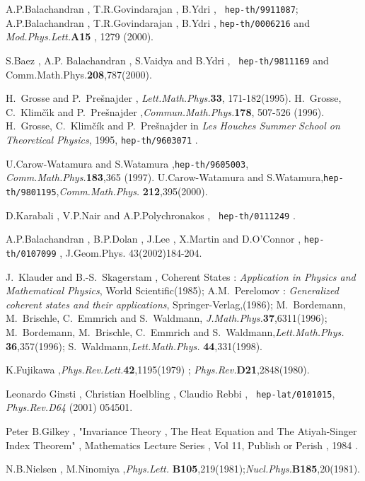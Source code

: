 \documentclass[a4paper,10pt]{article}
\begin{document}
\begin{thebibliography}{99}
A.P.Balachandran , T.R.Govindarajan , B.Ydri , {\tt
hep-th/9911087}; A.P.Balachandran , T.R.Govindarajan , B.Ydri ,
{\tt hep-th/0006216} and {\em Mod.Phys.Lett.}{\bf A15} , 1279
(2000).

S.Baez , A.P. Balachandran , S.Vaidya and B.Ydri , {\tt
hep-th/9811169} and Comm.Math.Phys.{\bf 208},787(2000).


H.~Grosse and P.~Pre\v{s}najder , {\em Lett.Math.Phys.}{\bf 33},
171-182(1995). H.~Grosse, C.~Klim\v{c}\'{\i}k and
P.~Pre\v{s}najder ,{\em Commun.Math.Phys.}{\bf 178}, 507-526
(1996). H.~Grosse, C.~Klim\v{c}\'{i}k and P.~Pre\v{s}najder in
{\em Les Houches Summer School on Theoretical Physics}, 1995,
{\tt hep-th/9603071} .


U.Carow-Watamura and S.Watamura ,{\tt hep-th/9605003},{\em
Comm.Math.Phys.}{\bf 183},365 (1997). U.Carow-Watamura and
S.Watamura,{\tt hep-th/9801195},{\em Comm.Math.Phys.} {\bf
212},395(2000).

D.Karabali , V.P.Nair and A.P.Polychronakos , {\tt
hep-th/0111249} .

A.P.Balachandran , B.P.Dolan , J.Lee , X.Martin and D.O'Connor ,
{\tt hep-th/0107099} , J.Geom.Phys. 43(2002)184-204.

J.~Klauder and B.-S.~Skagerstam , Coherent States : {\em
Application in Physics and Mathematical Physics}, World
Scientific(1985); A.M.~Perelomov : {\em Generalized coherent
states and their applications}, Springer-Verlag,(1986);
M.~Bordemann, M.~Brischle, C.~Emmrich and S.~Waldmann,{\em
J.Math.Phys.}{\bf 37},6311(1996); M.~Bordemann, M.~Brischle,
C.~Emmrich and S.~Waldmann,{\em Lett.Math.Phys.}{\bf
36},357(1996); S.~Waldmann,{\em Lett.Math.Phys.}{\bf
44},331(1998).

K.Fujikawa ,{\em Phys.Rev.Lett.}{\bf 42},1195(1979) ; {\em
Phys.Rev.}{\bf D21},2848(1980).

Leonardo Ginsti , Christian Hoelbling , Claudio Rebbi , {\tt
hep-lat/0101015}, {\em Phys.Rev.D64} (2001) 054501.


Peter B.Gilkey , "Invariance Theory , The Heat Equation and The Atiyah-Singer Index Theorem" , Mathematics Lecture
Series , Vol 11, Publish or Perish , 1984 .



N.B.Nielsen , M.Ninomiya ,{\em Phys.Lett.}{\bf
B105},219(1981);{\em Nucl.Phys.}{\bf B185},20(1981).


\end{thebibliography}
\end{document}
